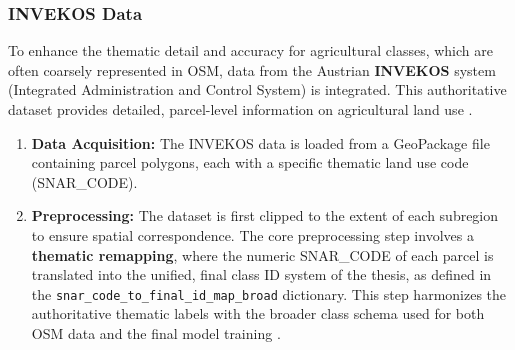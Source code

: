\documentclass{report}
\begin{document}
\subsubsection{INVEKOS Data}

To enhance the thematic detail and accuracy for agricultural classes, which are often coarsely represented in OSM, data from the Austrian \textbf{INVEKOS} system (Integrated Administration and Control System) is integrated. This authoritative dataset provides detailed, parcel-level information on agricultural land use \parencite{AgrarmarktAustriaINVEKOSSchlageOsterreich2024}.
\begin{enumerate}
    \item \textbf{Data Acquisition:} The INVEKOS data is loaded from a GeoPackage file containing parcel polygons, each with a specific thematic land use code (SNAR\_CODE).
    \item \textbf{Preprocessing:} The dataset is first clipped to the extent of each subregion to ensure spatial correspondence. The core preprocessing step involves a \textbf{thematic remapping}, where the numeric SNAR\_CODE of each parcel is translated into the unified, final class ID system of the thesis, as defined in the \texttt{snar\_code\_to\_final\_id\_map\_broad} dictionary. This step harmonizes the authoritative thematic labels with the broader class schema used for both OSM data and the final model training \parencite{JordahlEtAlgeopandasgeopandasv0812020}.
\end{enumerate}
\par
\end{document}
